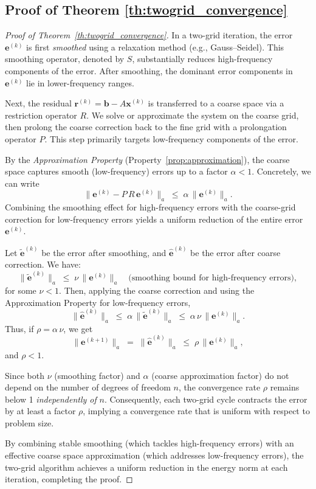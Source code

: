 \subsection{Proof of Theorem \ref{th:twogrid_convergence}} \label{appendix:proof_2}
\begin{proof}[Proof of Theorem~\ref{th:twogrid_convergence}]

In a two-grid iteration, the error \(\mathbf{e}^{(k)}\) is first \emph{smoothed} using a relaxation method (e.g., Gauss--Seidel). This smoothing operator, denoted by \(S\), substantially reduces high-frequency components of the error. After smoothing, the dominant error components in \(\mathbf{e}^{(k)}\) lie in lower-frequency ranges.

Next, the residual \(\mathbf{r}^{(k)} = \mathbf{b} - A \mathbf{x}^{(k)}\) is transferred to a coarse space via a restriction operator \(R\). We solve or approximate the system on the coarse grid, then prolong the coarse correction back to the fine grid with a prolongation operator \(P\). This step primarily targets low-frequency components of the error.

By the \emph{Approximation Property} (Property~\ref{prop:approximation}), the coarse space captures smooth (low-frequency) errors up to a factor \(\alpha < 1\). Concretely, we can write
\[
    \|\mathbf{e}^{(k)} - P\,R\,\mathbf{e}^{(k)}\|_{a}
    \;\le\;
    \alpha \,\|\mathbf{e}^{(k)}\|_{a}.
\]
Combining the smoothing effect for high-frequency errors with the coarse-grid correction for low-frequency errors yields a uniform reduction of the entire error \(\mathbf{e}^{(k)}\).

Let \(\widetilde{\mathbf{e}}^{(k)}\) be the error after smoothing, and \(\widehat{\mathbf{e}}^{(k)}\) be the error after coarse correction. We have:
\[
    \|\widetilde{\mathbf{e}}^{(k)}\|_{a} 
    \;\le\; 
    \nu \,\|\mathbf{e}^{(k)}\|_{a}
    \quad
    \text{(smoothing bound for high-frequency errors)},
\]
for some \(\nu < 1\). Then, applying the coarse correction and using the Approximation Property for low-frequency errors,
\[
    \|\widehat{\mathbf{e}}^{(k)}\|_{a} 
    \;\le\;
    \alpha \,\|\widetilde{\mathbf{e}}^{(k)}\|_{a}
    \;\le\;
    \alpha\,\nu \,\|\mathbf{e}^{(k)}\|_{a}.
\]
Thus, if \(\rho = \alpha\,\nu\), we get
\[
    \|\mathbf{e}^{(k+1)}\|_{a}
    \;=\;
    \|\widehat{\mathbf{e}}^{(k)}\|_{a}
    \;\le\;
    \rho\, \|\mathbf{e}^{(k)}\|_{a},
\]
and \(\rho < 1\).

Since both \(\nu\) (smoothing factor) and \(\alpha\) (coarse approximation factor) do not depend on the number of degrees of freedom \(n\), the convergence rate \(\rho\) remains below 1 \emph{independently of} \(n\). Consequently, each two-grid cycle contracts the error by at least a factor \(\rho\), implying a convergence rate that is uniform with respect to problem size.

By combining stable smoothing (which tackles high-frequency errors) with an effective coarse space approximation (which addresses low-frequency errors), the two-grid algorithm achieves a uniform reduction in the energy norm at each iteration, completing the proof.
\end{proof}

